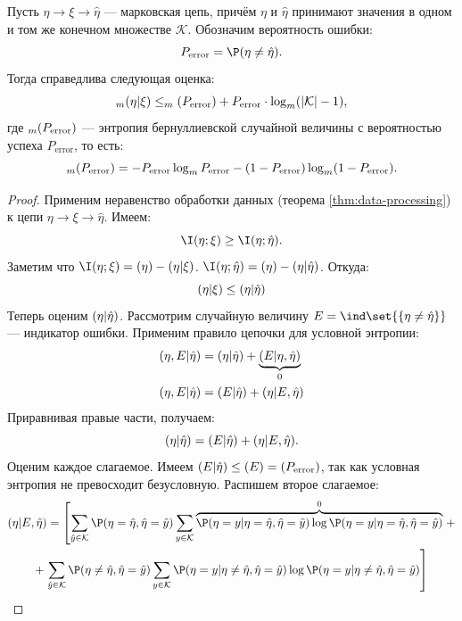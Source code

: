 \begin{theorem}
	\label{thm:fano}
	Пусть $\eta \to \xi \to \hat{\eta}$ — марковская цепь, причём $\eta$ и $\hat{\eta}$ принимают значения в одном и том же конечном множестве $\mathcal{K}$. Обозначим вероятность ошибки:
	\[
		P_{\mathrm{error}} = \P(\eta \neq \hat{\eta}).
	\]
	Тогда справедлива следующая оценка:
	\[
		\relax_m(\eta | \xi) \leq \relax_m(P_{\mathrm{error}}) + P_{\mathrm{error}} \cdot \log_m(|\mathcal{K}| - 1),
	\]
	где $\relax_m(P_{\mathrm{error}})$ — энтропия бернуллиевской случайной величины с вероятностью успеха $P_{\mathrm{error}}$, то есть:
	\[
		\relax_m(P_{\mathrm{error}}) = -P_{\mathrm{error}} \log_m P_{\mathrm{error}} - (1-P_{\mathrm{error}}) \log_m (1-P_{\mathrm{error}}).
	\]
\end{theorem}
\begin{proof}
	Применим неравенство обработки данных (теорема \ref{thm:data-processing}) к цепи $\eta \to \xi \to \hat{\eta}$. Имеем:
	\[
		\I(\eta; \xi) \geq \I(\eta; \hat{\eta}).
	\]
	Заметим что $\I(\eta; \xi) = \H(\eta) - \H(\eta | \xi)$. $\I(\eta; \hat{\eta}) = \H(\eta) - \H(\eta | \hat{\eta})$. Откуда:
	\[
		\relax(\eta | \xi) \leq \relax(\eta | \hat{\eta})
	\]
	Теперь оценим $\relax(\eta | \hat{\eta})$. Рассмотрим случайную величину $E = \ind\set{\{\eta \neq \hat{\eta}\}}$ --- индикатор ошибки. Применим правило цепочки для условной энтропии:
	\begin{align*}
		\relax(\eta, E | \hat{\eta}) &= \relax(\eta | \hat{\eta}) + \underbrace{\relax(E | \eta, \hat{\eta})}_{0} \\
		\relax(\eta, E | \hat{\eta}) &= \relax(E | \hat{\eta}) + \relax(\eta | E, \hat{\eta})
	\end{align*}
	Приравнивая правые части, получаем:
	\[
		\relax(\eta | \hat{\eta}) = \relax(E | \hat{\eta}) + \relax(\eta | E, \hat{\eta}).
	\]
	Оценим каждое слагаемое. Имеем $\relax(E | \hat{\eta}) \leq \relax(E) = \relax(P_{\mathrm{error}})$, так как условная энтропия не превосходит безусловную. Распишем второе слагаемое:
	\begin{multline*}
		\H(\eta| E, \hat{\eta}) = \left[
		\sum_{\hat{y} \in \mathcal{K}}\P(\eta = \hat{\eta}, \hat{\eta} = \hat{y}) \sum_{y \in \mathcal{K}}\overbrace{\P(\eta = y | \eta = \hat{\eta}, \hat{\eta} = \hat{y})\log\P(\eta = y | \eta = \hat{\eta}, \hat{\eta} = \hat{y})}^{0}\right. +\\+
	\left.\sum_{\hat{y} \in \mathcal{K}}\P(\eta \neq \hat{\eta}, \hat{\eta} = \hat{y}) \sum_{y \in \mathcal{K}}\P(\eta = y | \eta \neq \hat{\eta}, \hat{\eta} = \hat{y})\log\P(\eta = y | \eta \neq \hat{\eta}, \hat{\eta} = \hat{y})\right]

\end{multline*}
\end{proof}
